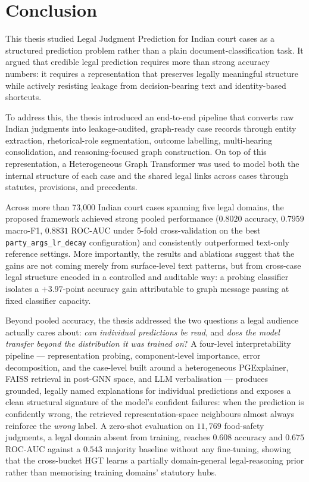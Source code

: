 \chapter{Conclusion}

This thesis studied Legal Judgment Prediction for Indian court cases as a
structured prediction problem rather than a plain document-classification
task. It argued that credible legal prediction requires more than strong
accuracy numbers: it requires a representation that preserves legally
meaningful structure while actively resisting leakage from decision-bearing
text and identity-based shortcuts.

To address this, the thesis introduced an end-to-end pipeline that converts
raw Indian judgments into leakage-audited, graph-ready case records through
entity extraction, rhetorical-role segmentation, outcome labelling,
multi-hearing consolidation, and reasoning-focused graph construction. On
top of this representation, a Heterogeneous Graph Transformer was used to
model both the internal structure of each case and the shared legal links
across cases through statutes, provisions, and precedents.

Across more than 73{,}000 Indian court cases spanning five legal domains,
the proposed framework achieved strong pooled performance
($0.8020$ accuracy, $0.7959$ macro-F1, $0.8831$ ROC-AUC under 5-fold
cross-validation on the best \texttt{party\_args\_lr\_decay}
configuration) and consistently outperformed text-only reference settings.
More importantly, the results and ablations suggest that the gains are not
coming merely from surface-level text patterns, but from cross-case legal
structure encoded in a controlled and auditable way: a probing classifier
isolates a $+3.97$-point accuracy gain attributable to graph message passing
at fixed classifier capacity.

Beyond pooled accuracy, the thesis addressed the two questions a legal
audience actually cares about: \emph{can individual predictions be
read}, and \emph{does the model transfer beyond the distribution it was
trained on}? A four-level interpretability pipeline --- representation
probing, component-level importance, error decomposition, and the
case-level  built around a heterogeneous
PGExplainer, FAISS retrieval in post-GNN space, and LLM verbalisation ---
produces grounded, legally named explanations for individual predictions
and exposes a clean structural signature of the model's confident
failures: when the prediction is confidently wrong, the retrieved
representation-space neighbours almost always reinforce the \emph{wrong}
label. A zero-shot evaluation on $11{,}769$ food-safety judgments, a
legal domain absent from training, reaches $0.608$ accuracy and
$0.675$ ROC-AUC against a $0.543$ majority baseline without any
fine-tuning, showing that the cross-bucket HGT learns a partially
domain-general legal-reasoning prior rather than memorising training
domains' statutory hubs.

